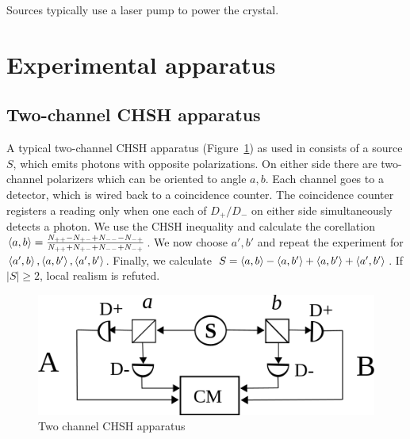 \documentclass[10pt, twocolumn]{article}
\begin{document}
Sources typically use a laser pump to power the crystal.
\section{Experimental apparatus}
\subsection{Two-channel CHSH apparatus}
A typical two-channel CHSH apparatus (Figure~\ref{fig:chsh}) as used in \cite{PhysRevLett.49.91} consists of a source $S$, which emits photons with opposite polarizations. On either side there are two-channel polarizers which can be oriented to angle $a,b$. Each channel goes to a detector, which is wired back to a coincidence counter. The coincidence counter registers a reading only when one each of $D_+/D_-$ on either side simultaneously detects a photon. We use the CHSH inequality and calculate the corellation $\Braket{a,b}=\frac{N_{++} - N_{+-} + N_{--} - N_{-+}}{N_{++} + N_{+-} + N_{--} + N_{-+}}$. We now choose $a', b'$ and repeat the experiment for $\Braket{a',b},\Braket{a,b'},\Braket{a',b'}$. Finally, we calculate $S=\Braket{a,b}-\Braket{a,b'}+\Braket{a,b'}+\Braket{a',b'}$. If $|S|\geq 2$, local realism is refuted.

\begin{figure}
\centering
\includegraphics[scale=0.5]{chsh-2ch}
\caption{Two channel CHSH apparatus}
\label{fig:chsh}
\end{figure}
\end{document}
